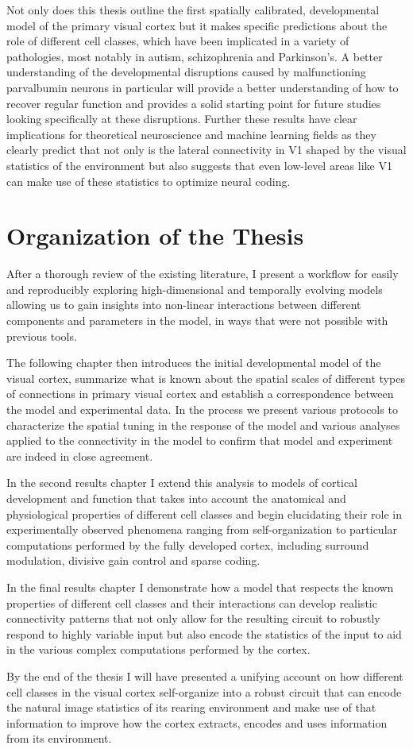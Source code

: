 Not only does this thesis outline the first spatially calibrated,
developmental model of the primary visual cortex but it makes specific
predictions about the role of different cell classes, which have been
implicated in a variety of pathologies, most notably in autism,
schizophrenia and Parkinson's. A better understanding of the
developmental disruptions caused by malfunctioning parvalbumin neurons
in particular will provide a better understanding of how to recover
regular function and provides a solid starting point for future
studies looking specifically at these disruptions. Further these
results have clear implications for theoretical neuroscience and
machine learning fields as they clearly predict that not only is the
lateral connectivity in V1 shaped by the visual statistics of the
environment but also suggests that even low-level areas like V1 can
make use of these statistics to optimize neural coding.

\section{Organization of the Thesis}

After a thorough review of the existing literature, I present a
workflow for easily and reproducibly exploring high-dimensional and
temporally evolving models allowing us to gain insights into
non-linear interactions between different components and parameters in
the model, in ways that were not possible with previous tools.

The following chapter then introduces the initial developmental model
of the visual cortex, summarize what is known about the spatial scales
of different types of connections in primary visual cortex and
establish a correspondence between the model and experimental data. In
the process we present various protocols to characterize the spatial
tuning in the response of the model and various analyses applied to
the connectivity in the model to confirm that model and experiment are
indeed in close agreement.

In the second results chapter I extend this analysis to models of
cortical development and function that takes into account the
anatomical and physiological properties of different cell classes and
begin elucidating their role in experimentally observed phenomena
ranging from self-organization to particular computations performed by
the fully developed cortex, including surround modulation, divisive
gain control and sparse coding.

In the final results chapter I demonstrate how a model that respects
the known properties of different cell classes and their interactions
can develop realistic connectivity patterns that not only allow for
the resulting circuit to robustly respond to highly variable input but
also encode the statistics of the input to aid in the various complex
computations performed by the cortex.

By the end of the thesis I will have presented a unifying account on
how different cell classes in the visual cortex self-organize into a
robust circuit that can encode the natural image statistics of its
rearing environment and make use of that information to improve how
the cortex extracts, encodes and uses information from its
environment.

